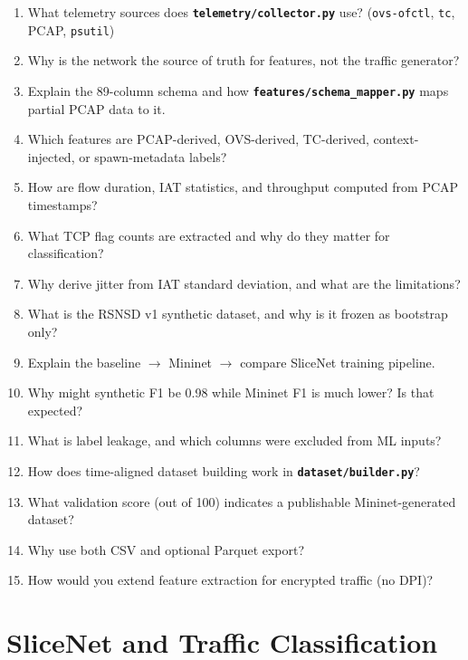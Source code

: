 \documentclass[11pt,a4paper]{article}
\newcommand{\proj}[1]{\textbf{\texttt{#1}}}
\begin{document}
\begin{enumerate}
    \item What telemetry sources does \proj{telemetry/collector.py} use? (\texttt{ovs-ofctl}, \texttt{tc}, PCAP, \texttt{psutil})
    \item Why is the network the source of truth for features, not the traffic generator?
    \item Explain the 89-column schema and how \proj{features/schema\_mapper.py} maps partial PCAP data to it.
    \item Which features are PCAP-derived, OVS-derived, TC-derived, context-injected, or spawn-metadata labels?
    \item How are flow duration, IAT statistics, and throughput computed from PCAP timestamps?
    \item What TCP flag counts are extracted and why do they matter for classification?
    \item Why derive jitter from IAT standard deviation, and what are the limitations?
    \item What is the RSNSD v1 synthetic dataset, and why is it frozen as bootstrap only?
    \item Explain the baseline $\rightarrow$ Mininet $\rightarrow$ compare SliceNet training pipeline.
    \item Why might synthetic F1 be 0.98 while Mininet F1 is much lower? Is that expected?
    \item What is label leakage, and which columns were excluded from ML inputs?
    \item How does time-aligned dataset building work in \proj{dataset/builder.py}?
    \item What validation score (out of 100) indicates a publishable Mininet-generated dataset?
    \item Why use both CSV and optional Parquet export?
    \item How would you extend feature extraction for encrypted traffic (no DPI)?
\end{enumerate}

\section{SliceNet and Traffic Classification}
\end{document}
